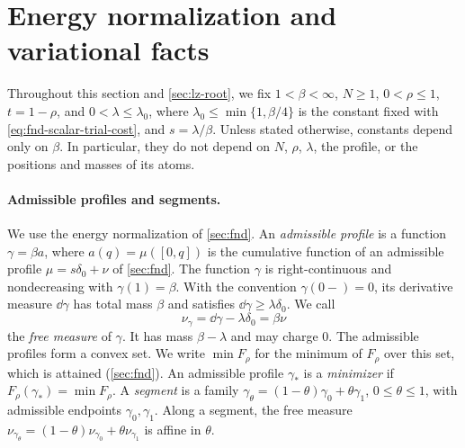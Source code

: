 \section{Energy normalization and variational facts}
\label{subsec:lz-inputs}

Throughout this section and \cref{sec:lz-root}, we fix $1<\beta<\infty$,
$N\ge1$, $0<\rho\le1$, $t=1-\rho$, and $0<\lambda\le\lambda_0$, where
$\lambda_0\le\min\{1,\beta/4\}$ is the constant fixed with
\eqref{eq:fnd-scalar-trial-cost}, and $s=\lambda/\beta$. Unless
stated otherwise, constants depend only on $\beta$. In particular, they do
not depend on $N$, $\rho$, $\lambda$, the profile, or the positions and
masses of its atoms.

\paragraph{Admissible profiles and segments.}
We use the energy normalization of \cref{sec:fnd}. An \emph{admissible
profile} is a function $\gamma=\beta a$, where $a(q)=\mu([0,q])$ is the
cumulative function of an admissible profile $\mu=s\delta_0+\nu$ of
\cref{sec:fnd}. The function $\gamma$ is right-continuous and
nondecreasing with $\gamma(1)=\beta$. With the convention $\gamma(0-)=0$, its
derivative measure $\dd\gamma$ has total mass $\beta$ and satisfies
$\dd\gamma\ge\lambda\delta_0$. We call
\[
 \nu_\gamma=\dd\gamma-\lambda\delta_0=\beta\nu
\]
the \emph{free measure} of $\gamma$. It has mass $\beta-\lambda$ and may
charge $0$. The admissible profiles form a convex set. We write $\min F_\rho$
for the minimum of $F_\rho$ over this set, which is attained
(\cref{sec:fnd}). An admissible profile $\gamma_*$ is a \emph{minimizer} if
$F_\rho(\gamma_*)=\min F_\rho$. A \emph{segment} is a family
$\gamma_\theta=(1-\theta)\gamma_0+\theta\gamma_1$, $0\le\theta\le1$, with
admissible endpoints $\gamma_0,\gamma_1$. Along a segment, the free measure
$\nu_{\gamma_\theta}=(1-\theta)\nu_{\gamma_0}+\theta\nu_{\gamma_1}$ is affine
in $\theta$.

